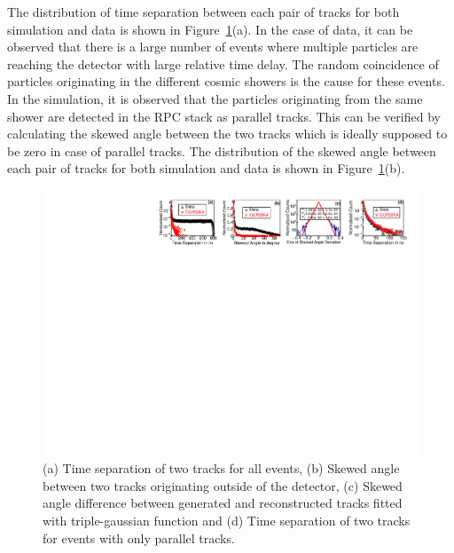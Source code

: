\documentclass[a4paper,12pt,twoside]{article}
\begin{document}
The distribution of time separation between each pair of tracks for both simulation and data is shown in Figure~\ref{fig:time_sep}(a). In the case of data, it can be observed that there is a large number of events where multiple particles are reaching the detector with large relative time delay. The random coincidence of particles originating in the different cosmic showers is the cause for these events. In the simulation, it is observed that the particles originating from the same shower are detected in the RPC stack as parallel tracks. This can be verified by calculating the skewed angle between the two tracks which is ideally supposed to be zero in case of parallel tracks. The distribution of the skewed angle between each pair of tracks for both simulation and data is shown in Figure~\ref{fig:time_sep}(b).
\begin{figure}[h]
  \includegraphics[width=1.0\linewidth]{time_skew_all.pdf} 
  \caption{(a) Time separation of two tracks for all events, (b) Skewed angle between two tracks originating outside of the detector, (c) Skewed angle difference between generated and reconstructed tracks fitted with triple-gaussian function and (d) Time separation of two tracks for events with only parallel tracks.}
  \label{fig:time_sep}
\end{figure}
\end{document}

